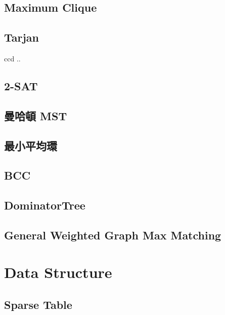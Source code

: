 \subsection{Maximum Clique}

\subsection{Tarjan}ccd ..

\subsection{2-SAT}

\subsection{曼哈頓 MST}

\subsection{最小平均環}

%
\subsection{BCC}

\subsection{DominatorTree}

\subsection{General Weighted Graph Max Matching}


\section{Data Structure}

%
\subsection{Sparse Table}

